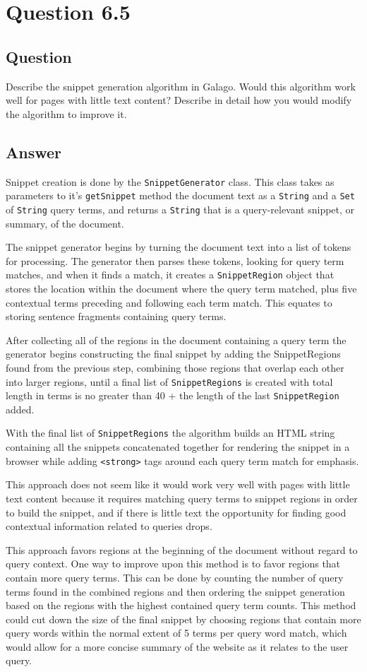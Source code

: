 \section{Question 6.5}

\subsection{Question}
Describe the snippet generation algorithm in Galago. Would this algorithm
work well for pages with little text content? Describe in detail how you would
modify the algorithm to improve it.


\subsection{Answer}
Snippet creation is done by the \texttt{SnippetGenerator} class.  This class takes as parameters to it's \texttt{getSnippet} method the document text as a \texttt{String} and a \texttt{Set} of \texttt{String} query terms, and returns a \texttt{String} that is a query-relevant snippet, or summary, of the document.

The snippet generator begins by turning the document text into a list of tokens for processing.  The generator then parses these tokens, looking for query term matches, and when it finds a match, it creates a \texttt{SnippetRegion} object that stores the location within the document where the query term matched, plus five contextual terms preceding and following each term match.  This equates to storing sentence fragments containing query terms.

After collecting all of the regions in the document containing a query term the generator begins constructing the final snippet by adding the SnippetRegions found from the previous step, combining those regions that overlap each other into larger regions, until a final list of \texttt{SnippetRegions} is created with total length in terms is no greater than 40 + the length of the last \texttt{SnippetRegion} added.

With the final list of \texttt{SnippetRegions} the algorithm builds an HTML string containing all the snippets concatenated together for rendering the snippet in a browser while adding \texttt{<strong>} tags around each query term match for emphasis.

This approach does not seem like it would work very well with pages with little text content because it requires matching query terms to snippet regions in order to build the snippet, and if there is little text the opportunity for finding good contextual information related to queries drops.

This approach favors regions at the beginning of the document without regard to query context.  One way to improve upon this method is to favor regions that contain more query terms.  This can be done by counting the number of query terms found in the combined regions and then ordering the snippet generation based on the regions with the highest contained query term counts.  This method could cut down the size of the final snippet by choosing regions that contain more query words within the normal extent of 5 terms per query word match, which would allow for a more concise summary of the website as it relates to the user query.
